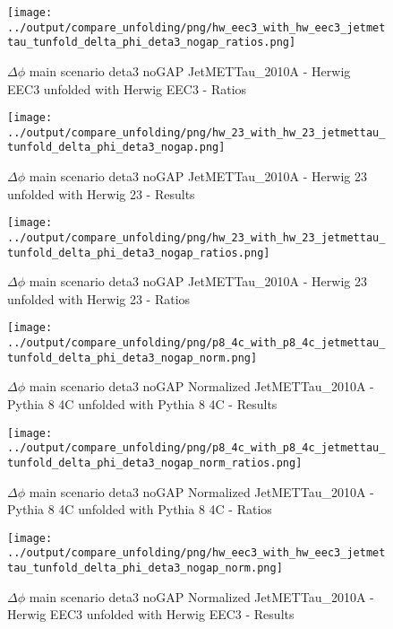 \documentclass[11pt]{book}
\begin{document}
\begin{figure}[ht]
\centering
\texttt{[image: ../output/compare\_unfolding/png/hw\_eec3\_with\_hw\_eec3\_jetmettau\_tunfold\_delta\_phi\_deta3\_nogap\_ratios.png]}
\caption{$\Delta\phi$ main scenario deta3 noGAP JetMETTau\_2010A - Herwig EEC3 unfolded with Herwig EEC3 - Ratios}
\label{hw_eec3_hw_eec3_jetmettau_tunfold_delta_phi_deta3_nogap_b}
\end{figure}

\begin{figure}[ht]
\centering
\texttt{[image: ../output/compare\_unfolding/png/hw\_23\_with\_hw\_23\_jetmettau\_tunfold\_delta\_phi\_deta3\_nogap.png]}
\caption{$\Delta\phi$ main scenario deta3 noGAP JetMETTau\_2010A - Herwig 23 unfolded with Herwig 23 - Results}
\label{hw_23_hw_23_jetmettau_tunfold_delta_phi_deta3_nogap_a}
\end{figure}

\begin{figure}[ht]
\centering
\texttt{[image: ../output/compare\_unfolding/png/hw\_23\_with\_hw\_23\_jetmettau\_tunfold\_delta\_phi\_deta3\_nogap\_ratios.png]}
\caption{$\Delta\phi$ main scenario deta3 noGAP JetMETTau\_2010A - Herwig 23 unfolded with Herwig 23 - Ratios}
\label{hw_23_hw_23_jetmettau_tunfold_delta_phi_deta3_nogap_b}
\end{figure}



\begin{figure}[ht]
\centering
\texttt{[image: ../output/compare\_unfolding/png/p8\_4c\_with\_p8\_4c\_jetmettau\_tunfold\_delta\_phi\_deta3\_nogap\_norm.png]}
\caption{$\Delta\phi$ main scenario deta3 noGAP Normalized JetMETTau\_2010A - Pythia 8 4C unfolded with Pythia 8 4C - Results}
\label{p8_p8_jetmettau_tunfold_delta_phi_deta3_nogap_norm_a}
\end{figure}

\begin{figure}[ht]
\centering
\texttt{[image: ../output/compare\_unfolding/png/p8\_4c\_with\_p8\_4c\_jetmettau\_tunfold\_delta\_phi\_deta3\_nogap\_norm\_ratios.png]}
\caption{$\Delta\phi$ main scenario deta3 noGAP Normalized JetMETTau\_2010A - Pythia 8 4C unfolded with Pythia 8 4C - Ratios}
\label{p8_p8_jetmettau_tunfold_delta_phi_deta3_nogap_norm_b}
\end{figure}

\begin{figure}[ht]
\centering
\texttt{[image: ../output/compare\_unfolding/png/hw\_eec3\_with\_hw\_eec3\_jetmettau\_tunfold\_delta\_phi\_deta3\_nogap\_norm.png]}
\caption{$\Delta\phi$ main scenario deta3 noGAP Normalized JetMETTau\_2010A - Herwig EEC3 unfolded with Herwig EEC3 - Results}
\label{hw_eec3_hw_eec3_jetmettau_tunfold_delta_phi_deta3_nogap_norm_a}
\end{figure}
\end{document}
